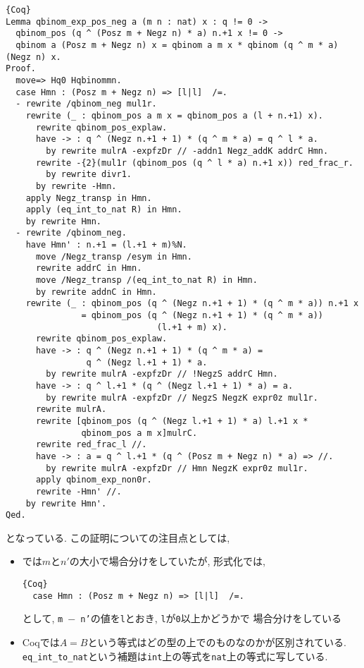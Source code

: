 \documentclass[11pt]{jarticle}
\theoremstyle{mystyle}
\newcommand{\0}{\textbf{0}}
\newcommand{\1}{\textbf{1}}
\newcommand{\2}{\textbf{2}}
\begin{document}
\begin{lstlisting}{Coq}
Lemma qbinom_exp_pos_neg a (m n : nat) x : q != 0 ->
  qbinom_pos (q ^ (Posz m + Negz n) * a) n.+1 x != 0 ->
  qbinom a (Posz m + Negz n) x = qbinom a m x * qbinom (q ^ m * a) (Negz n) x.
Proof.
  move=> Hq0 Hqbinommn.
  case Hmn : (Posz m + Negz n) => [l|l]  /=.
  - rewrite /qbinom_neg mul1r.
    rewrite (_ : qbinom_pos a m x = qbinom_pos a (l + n.+1) x).
      rewrite qbinom_pos_explaw.
      have -> : q ^ (Negz n.+1 + 1) * (q ^ m * a) = q ^ l * a.
        by rewrite mulrA -expfzDr // -addn1 Negz_addK addrC Hmn.
      rewrite -{2}(mul1r (qbinom_pos (q ^ l * a) n.+1 x)) red_frac_r.
        by rewrite divr1.
      by rewrite -Hmn.
    apply Negz_transp in Hmn.
    apply (eq_int_to_nat R) in Hmn.
    by rewrite Hmn.
  - rewrite /qbinom_neg.
    have Hmn' : n.+1 = (l.+1 + m)%N.
      move /Negz_transp /esym in Hmn.
      rewrite addrC in Hmn.
      move /Negz_transp /(eq_int_to_nat R) in Hmn.
      by rewrite addnC in Hmn.
    rewrite (_ : qbinom_pos (q ^ (Negz n.+1 + 1) * (q ^ m * a)) n.+1 x 
               = qbinom_pos (q ^ (Negz n.+1 + 1) * (q ^ m * a))
                              (l.+1 + m) x).
      rewrite qbinom_pos_explaw.
      have -> : q ^ (Negz n.+1 + 1) * (q ^ m * a) =
                q ^ (Negz l.+1 + 1) * a.
        by rewrite mulrA -expfzDr // !NegzS addrC Hmn.
      have -> : q ^ l.+1 * (q ^ (Negz l.+1 + 1) * a) = a.
        by rewrite mulrA -expfzDr // NegzS NegzK expr0z mul1r.
      rewrite mulrA.
      rewrite [qbinom_pos (q ^ (Negz l.+1 + 1) * a) l.+1 x *
               qbinom_pos a m x]mulrC.
      rewrite red_frac_l //.
      have -> : a = q ^ l.+1 * (q ^ (Posz m + Negz n) * a) => //.
        by rewrite mulrA -expfzDr // Hmn NegzK expr0z mul1r.
      apply qbinom_exp_non0r.
      rewrite -Hmn' //.
    by rewrite Hmn'.
Qed.
\end{lstlisting}
となっている. この証明についての注目点としては, 
\begin{itemize}
  \item \cite{Kac}では$m$と$n'$の大小で場合分けをしていたが, 形式化では, 
           \begin{lstlisting}{Coq}
  case Hmn : (Posz m + Negz n) => [l|l]  /=. \end{lstlisting}
           として, {\tt m $-$ n'}の値を{\tt l}とおき, {\tt l}が{\tt 0}以上かどうかで
           場合分けをしている
  \item Coqでは$A = B$という等式はどの型の上でのものなのかが区別されている. 
           {\tt eq\_int\_to\_nat}という補題は{\tt int}上の等式を{\tt nat}上の等式に写している. 
\end{itemize}
\end{document}
